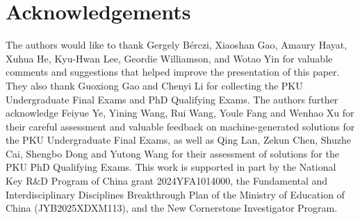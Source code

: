 \documentclass[11pt]{article}
\numberwithin{equation}{section}
\begin{document}
\begin{enumerate}
\end{enumerate}



\section*{Acknowledgements}

The authors would like to thank Gergely Bérczi, Xiaoshan Gao, Amaury Hayat, Xuhua He, Kyu-Hwan Lee, Geordie Williamson, and Wotao Yin for valuable comments and suggestions that helped improve the presentation of this paper. They also thank Guoxiong Gao and Chenyi Li for collecting the PKU Undergraduate Final Exams and PhD Qualifying Exams. The authors further acknowledge Feiyue Ye, Yining Wang, Rui Wang, Youle Fang and Wenhao Xu for their careful assessment and valuable feedback on machine-generated solutions for the PKU Undergraduate Final Exams, as well as Qing Lan, Zekun Chen, Shuzhe Cai, Shengbo Dong and Yutong Wang for their assessment of solutions for the PKU PhD Qualifying Exams. This work is supported in part by the National Key R\&D Program of China grant 2024YFA1014000, the Fundamental and Interdisciplinary Disciplines Breakthrough Plan of the Ministry of Education of China (JYB2025XDXM113), and the New Cornerstone Investigator Program.



\end{document}
